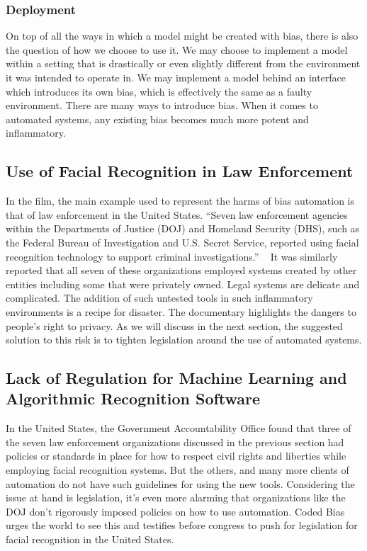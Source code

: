 \documentclass[sigconf, 10pt]{acmart}
\begin{document}
\subsubsection{Deployment}
On top of all the ways in which a model might be created with bias, there is also the question of how we choose to use it. We may choose to implement a model within a setting that is drastically or even slightly different from the environment it was intended to operate in. We may implement a model behind an interface which introduces its own bias, which is effectively the same as a faulty environment. There are many ways to introduce bias. When it comes to automated systems, any existing bias becomes much more potent and inflammatory.
\subsection{Use of Facial Recognition in Law Enforcement}
In the film, the main example used to represent the harms of bias automation is that of law enforcement in the United States. “Seven law enforcement agencies within the Departments of Justice (DOJ) and Homeland Security (DHS), such as the Federal Bureau of Investigation and U.S. Secret Service, reported using facial recognition technology to support criminal investigations.” ~\cite{used_second(1)} It was similarly reported that all seven of these organizations employed systems created by other entities including some that were privately owned. Legal systems are delicate and complicated. The addition of such untested tools in such inflammatory environments is a recipe for disaster. The documentary highlights the dangers to people’s right to privacy. As we will discuss in the next section, the suggested solution to this risk is to tighten legislation around the use of automated systems. 
\subsection{Lack of Regulation for Machine Learning and Algorithmic Recognition Software}
In the United States, the Government Accountability Office found that three of the seven law enforcement organizations discussed in the previous section had policies or standards in place for how to respect civil rights and liberties while employing facial recognition systems. But the others, and many more clients of automation do not have such guidelines for using the new tools. Considering the issue at hand is legislation, it’s even more alarming that organizations like the DOJ don’t rigorously imposed policies on how to use automation. Coded Bias urges the world to see this and testifies before congress to push for legislation for facial recognition in the United States.
\end{document}

